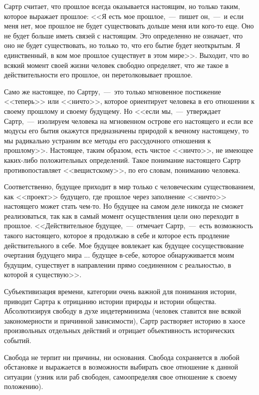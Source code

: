 \documentclass{bmstu}
\begin{document}
Сартр считает, что прошлое всегда оказывается настоящим, но только таким, которое выражает прошлое: <<Я есть мое прошлое,~---~пишет он,~---~и если меня нет, мое прошлое не будет существовать дольше меня или кого-то еще. Оно не будет больше иметь связей с настоящим. Это определенно не означает, что оно не будет существовать, но только то, что его бытие будет неоткрытым. Я единственный, в ком мое прошлое существует в этом мире>>. Выходит, что во всякий момент своей жизни человек свободно определяет, что же такое в действительности его прошлое, он перетолковывает прошлое.

Само же настоящее, по Сартру,~---~это только мгновенное постижение <<теперь>> или <<ничто>>, которое ориентирует человека в его отношении к своему прошлому и своему будущему. Но <<если мы,~---~утверждает Сартр,~---~изолируем человека на мгновенном острове его настоящего и если все модусы его бытия окажутся предназначены природой к вечному настоящему, то мы радикально устраним все методы его рассудочного отношения к прошлому>>. Настоящее, таким образом, есть чистое <<ничто>>, не имеющее каких-либо положительных определений. Такое понимание настоящего Сартр противопоставляет <<вещистскому>>, по его словам, пониманию человека.

Соответственно, будущее приходит в мир только с человеческим существованием, как <<проект>> будущего, где прошлое через заполнение <<ничто>> настоящего может стать чем-то. Но будущее на самом деле никогда не сможет реализоваться, так как в самый момент осуществления цели оно переходит в прошлое. <<Действительное будущее,~---~отмечает Сартр,~---~есть возможность такого настоящего, которое я продолжаю в себе и которое есть продление действительного в себе. Мое будущее вовлекает как будущее сосуществование очертания будущего мира ... будущее в-себе, которое обнаруживается моим будущим, существует в направлении прямо соединенном с реальностью, в которой я существую>>.

Субъективизация времени, категории очень важной для понимания истории, приводит Сартра к отрицанию истории природы и истории общества. Абсолютизируя свободу в духе индетерминизма (человек ставится вне всякой закономерности и причинной зависимости), Сартр растворяет историю в хаосе произвольных отдельных действий и отрицает объективность исторических событий.

Свобода не терпит ни причины, ни основания. Свобода сохраняется в любой обстановке и выражается в возможности выбирать свое отношение к данной ситуации (узник или раб свободен, самоопределяя свое отношение к своему положению).
\end{document}
